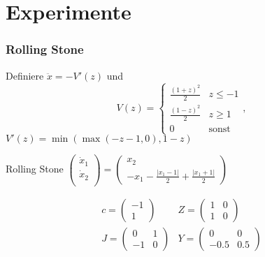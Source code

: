 \section[Experimente]{Experimente}

\begin{frame}[<+->]
\frametitle{Rolling Stone}
\begin{minipage}[c]{0.39\textwidth}
\scalebox{1.07}{}
\scalebox{1.2}{}
\end{minipage}
\hfill
\begin{minipage}[c]{0.6\textwidth}
Definiere $\ddot x = -V'(z)$ und 
\[
 V(z) = 
 \begin{cases}
 \frac{(1+z)^2}{2} & z\leq -1\\
 \frac{(1-z)^2}{2} &  z\geq 1\\
  0 & \text{sonst}
 \end{cases},
\]
$ V'(z) = \min(\max(-z-1,0),1-z)$
\pause
\begin{block}{Rolling Stone}
\centering
  $
  \begin{pmatrix}
   \dot x_1 \\
   \dot x_2 \\
  \end{pmatrix}
 = 
 \begin{pmatrix}
  x_2 \\
  -x_1 - \frac{|x_1-1|}{2} + \frac{|x_1+1|}{2}
 \end{pmatrix}
$
\end{block}
\vspace*{-0.5cm}
\pause
\[
\begin{aligned}
c = \begin{pmatrix}
     -1\\
     1
    \end{pmatrix}
& 
 Z = \begin{pmatrix}
      1 & 0 \\
      1 & 0
     \end{pmatrix} 
 \\
J = \begin{pmatrix}
      0&1\\
      -1 & 0
     \end{pmatrix}
 &
 Y = \begin{pmatrix}
      0 & 0\\
      -0.5  & 0.5
     \end{pmatrix}
\end{aligned}
\]
\end{minipage}
\end{frame}
